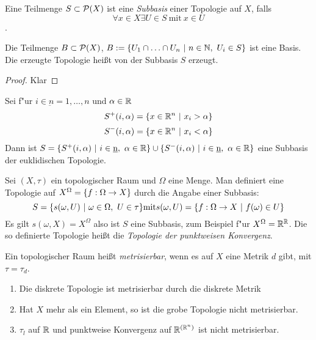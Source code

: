 \begin{dfn}
    Eine Teilmenge $S\subset \mathcal{P}(X)$ ist eine \emph{Subbasis} einer
    Topologie auf $X$, falls \[ \forall x\in X \exists U\in S \ \mathrm{mit}\
    x\in U \].
    \begin{stz}
        Die Teilmenge $B \subset \mathcal{P}(X)$, $B := \mdef[U_1 \cap \ldots
        \cap U_n]{n\in \N,\ U_i \in S}$ ist eine Basis. Die erzeugte Topologie
        hei\ss{}t von der Subbasis $S$ erzeugt.
        \begin{proof}
            Klar
        \end{proof}
    \end{stz}
    \begin{bsp}
        Sei f"ur $i\in \underbar{n} = {1, \ldots, n}$ und $\alpha\in\mathbb{R}$
        \[S^+(i, \alpha)=\mdef[x\in\R^n]{x_i>\alpha}\]
        \[S^-(i, \alpha)=\mdef[x\in\R^n]{x_i<\alpha}\]
        Dann ist $S=\mdef[S^+(i,\alpha)]{i\in\underbar n,\ \alpha\in\R}
        \cup \mdef[S^-(i,\alpha)]{i\in\underbar n,\ \alpha\in\R}$
        eine Subbasis der euklidischen Topologie.
    \end{bsp}
    \begin{bsp}
        Sei $(X,\tau)$ ein topologischer Raum und $\Omega$ eine Menge. Man
        definiert eine Topologie auf $X^\Omega = \mdef{f:\Omega\to X}$ durch die
        Angabe einer Subbasis:
        \[S=\mdef[s(\omega, U)]{\omega\in\Omega,\ U\in\tau} \mathrm{ mit }
        s(\omega, U)=\mdef[f:\Omega\to X]{f(\omega)\in U}\]
        Es gilt $s(\omega, X)=X^\Omega$ also ist $S$ eine Subbasis, zum Beispiel
        f"ur $X^\Omega = \mathbb{R}^{\mathbb{R}}$. Die so definierte Topologie hei\ss{}t die
        \emph{Topologie der punktweisen Konvergenz}.
    \end{bsp}
\end{dfn}

\begin{dfn}
    Ein topologischer Raum hei\ss{}t \emph{metrisierbar}, wenn es auf $X$ eine
    Metrik $d$ gibt, mit $\tau=\tau_d$.
    \begin{bsp}
        \begin{enumerate}
            \item Die diskrete Topologie ist metrisierbar durch die diskrete Metrik
            \item Hat $X$ mehr als ein Element, so ist die grobe Topologie nicht
                metrisierbar.
            \item $\tau_l$ auf $\mathbb{R}$ und punktweise Konvergenz auf $\mathbb{R}^{(\mathbb{R}^n)}$ ist
                nicht metrisierbar.
        \end{enumerate}
    \end{bsp}
\end{dfn}

